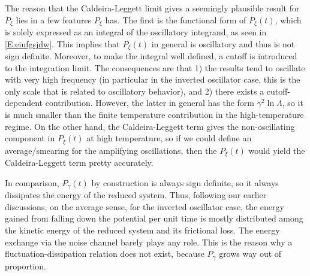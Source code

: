 \documentclass[11pt,a4paper]{article}
\begin{document}
The reason that the Caldeira-Leggett limit gives a seemingly plausible result for $P_{\xi}$ lies in a few features $P_{\xi}$ has. The first is the functional form of $P_{\xi}(t)$, which is solely expressed as an integral of the oscillatory integrand, as seen in \eqref{E:eiufgsjdw}. This implies that $P_{\xi}(t)$ in general is oscillatory and thus is not sign definite. Moreover, to make the integral well defined, a cutoff is introduced to the integration limit. The consequences are that 1) the results tend to oscillate with very high frequency (in particular in the inverted oscillator case, this is the only scale that is related to oscillatory behavior), and 2) there exists a cutoff-dependent contribution. However, the latter in general has the form $\gamma^{2}\ln\Lambda$, so it is much smaller than the finite temperature contribution in the high-temperature regime. On the other hand, the Caldeira-Leggett term gives the non-oscillating component in $P_{\xi}(t)$ at high temperature, so if we could define an {average/smearing} for the amplifying oscillations, then the $P_{\xi}(t)$ would yield the Caldeira-Leggett term pretty accurately. 




In comparison, $P_{\gamma}(t)$ by construction is always sign definite, so it always dissipates the energy of the reduced system. Thus, following our earlier discussions, on the average sense, for the inverted oscillator case, the energy gained from falling down the potential per unit time is mostly distributed among the kinetic energy of the reduced system and its frictional loss. The energy exchange via the noise channel barely plays any role. This is the reason why a fluctuation-dissipation relation does not exist,  because $P_{\gamma}$ grows way out of proportion.
 




\newpage
\end{document}
